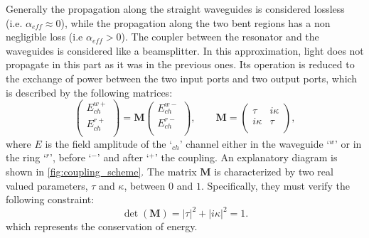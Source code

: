 Generally the propagation along the straight waveguides is considered lossless (i.e. $\alpha_{eff}\approx 0$), while the propagation along the two bent regions has a non negligible loss (i.e $\alpha_{eff}> 0$).
The coupler between the resonator and the waveguides is considered like a beamsplitter.
In this approximation, light does not propagate in this part as it was in the previous ones.
Its operation is reduced to the exchange of power between the two input ports and two output ports, which is described by the following matrices:
\begin{equation}
\begin{pmatrix}
E^{w+}_{ch} \\
E^{r+}_{ch} \\
\end{pmatrix} = \textbf{M}
\begin{pmatrix}
E^{w-}_{ch} \\
E^{r-}_{ch} \\
\end{pmatrix}, \qquad \textbf{M} = 
\begin{pmatrix}
\tau & i\kappa \\
i\kappa & \tau \\
\end{pmatrix},
\end{equation}
where $E$ is the field amplitude of the `$_{ch}$' channel either in the waveguide `$^w$' or in the ring `$^r$', before `$^-$' and after `$^+$' the coupling.
An explanatory diagram is shown in \autoref{fig:coupling_scheme}.
The matrix $\textbf{M}$ is characterized by two real valued parameters, $\tau$ and $\kappa$, between $0$ and $1$.
Specifically, they must verify the following constraint:
\begin{equation}
\det\left(\textbf{M}\right) = |\tau|^2 + |i\kappa|^2 = 1.
\end{equation}
which represents the conservation of energy.

